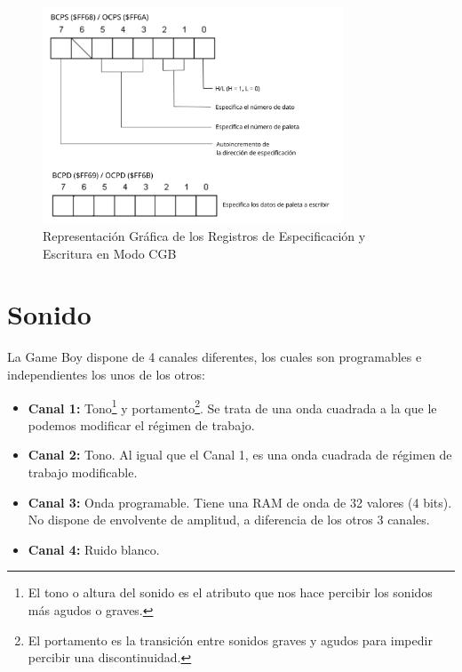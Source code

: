 \begin{figure}[h]
\centering
\includegraphics[width=0.8\textwidth]{include/images/GameBoy/registrospaleta.png}
\caption{Representación Gráfica de los Registros de Especificación y Escritura en Modo CGB}
\label{figure:PalRegisters}
\end{figure}

\clearpage

\section{Sonido}
\label{anexo:sonido}

La Game Boy dispone de 4 canales diferentes, los cuales son programables e independientes los unos de los otros:

\begin{itemize}
	\item \textbf{Canal 1:} Tono\footnote{El tono o altura del sonido es el atributo que nos hace percibir los sonidos más agudos o graves.} y portamento\footnote{El portamento es la transición entre sonidos graves y agudos para impedir percibir una discontinuidad.}. Se trata de una onda cuadrada a la que le podemos modificar el régimen de trabajo.
	
	\item \textbf{Canal 2:} Tono. Al igual que el Canal 1, es una onda cuadrada de régimen de trabajo modificable.
	
	\item \textbf{Canal 3:} Onda programable. Tiene una RAM de onda de 32 valores (4 bits). No dispone de envolvente de amplitud, a diferencia de los otros 3 canales.
	
	\item \textbf{Canal 4:} Ruido blanco.
	
\end{itemize}


